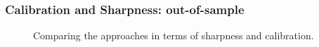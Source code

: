 \documentclass{beamer}
\begin{document}
\begin{frame}
\frametitle{Calibration and Sharpness: out-of-sample}

\begin{figure}[h!]
\caption[Optional caption for list of figures]{Comparing the approaches in terms of sharpness and calibration.}
\label{Calibration-Out}
\end{figure}
\end{frame}
\end{document}
